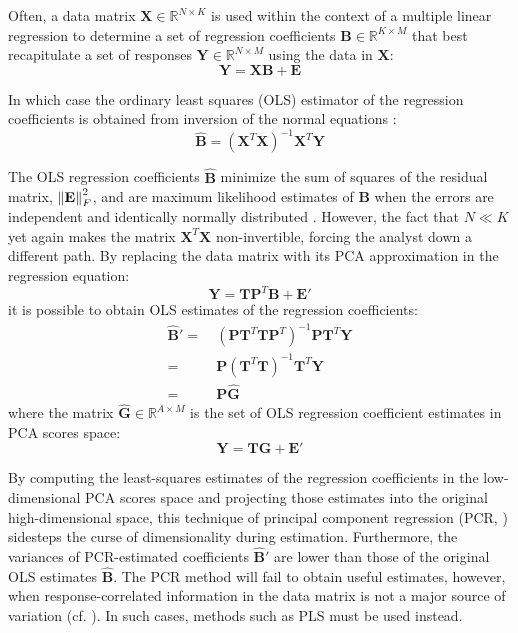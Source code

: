 \begin{doublespace}
Often, a data matrix $\mathbf{X} \in \mathbb{R}^{N \times K}$ is used within
the context of a multiple linear regression to determine a set of regression
coefficients $\mathbf{B} \in \mathbb{R}^{K \times M}$ that best recapitulate
a set of responses $\mathbf{Y} \in \mathbb{R}^{N \times M}$ using the data in
$\mathbf{X}$:
\begin{equation}
\mathbf{Y} = \mathbf{X} \mathbf{B} + \mathbf{E}
\end{equation}

In which case the ordinary least squares (OLS) estimator of the regression
coefficients is obtained from inversion of the normal equations
\cite{draper1998}:
\begin{equation}
\hat{\mathbf{B}} = (\mathbf{X}^T \mathbf{X})^{-1} \mathbf{X}^T \mathbf{Y}
\end{equation}

The OLS regression coefficients $\hat{\mathbf{B}}$ minimize the sum of squares
of the residual matrix, $\left\| \mathbf{E} \right\|_F^2$, and are maximum likelihood
estimates of $\mathbf{B}$ when the errors are independent and identically
normally distributed \cite{draper1998}. However, the fact that $N \ll K$ yet
again makes the matrix $\mathbf{X}^T \mathbf{X}$ non-invertible, forcing the
analyst down a different path. By replacing the data matrix with its PCA
approximation in the regression equation:
\begin{equation}
\mathbf{Y} = \mathbf{T} \mathbf{P}^T \mathbf{B} + \mathbf{E}'
\end{equation}
it is possible to obtain OLS estimates of the regression coefficients:
\begin{align}
\hat{\mathbf{B}}'
 =& \: (\mathbf{P} \mathbf{T}^T \mathbf{T} \mathbf{P}^T)^{-1}
       \mathbf{P} \mathbf{T}^T \mathbf{Y}
 \nonumber \\
 =& \: \mathbf{P} (\mathbf{T}^T \mathbf{T})^{-1} \mathbf{T}^T \mathbf{Y}
 \\
 =& \: \mathbf{P} \hat{\mathbf{G}}
\end{align}
where the matrix $\hat{\mathbf{G}} \in \mathbb{R}^{A \times M}$ is the set of
OLS regression coefficient estimates in PCA scores space:
\begin{equation}
\mathbf{Y} = \mathbf{T} \mathbf{G} + \mathbf{E}'
\end{equation}

By computing the least-squares estimates of the regression coefficients in the
low-dimensional PCA scores space and projecting those estimates into the
original high-dimensional space, this technique of principal component
regression (PCR, \cite{jolliffe2002}) sidesteps the curse of dimensionality
during estimation. Furthermore, the variances of PCR-estimated coefficients
$\hat{\mathbf{B}}'$ are lower than those of the original OLS estimates
$\hat{\mathbf{B}}$. The PCR method will fail to obtain useful estimates,
however, when response-correlated information in the data matrix is not
a major source of variation (cf. ). In such cases,
methods such as PLS must be used instead.
\end{doublespace}

